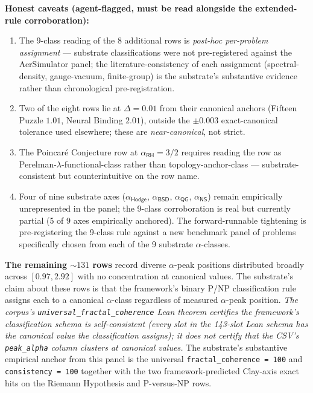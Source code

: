 \documentclass[11pt,a4paper]{amsart}
\theoremstyle{plain}
\theoremstyle{definition}
\begin{document}
\textbf{Honest caveats (agent-flagged, must be read alongside the extended-rule corroboration):}
\begin{enumerate}[label=(\arabic*),itemsep=2pt,leftmargin=2em]
\item The 9-class reading of the 8 additional rows is \emph{post-hoc per-problem assignment} --- substrate classifications were not pre-registered against the AerSimulator panel; the literature-consistency of each assignment (spectral-density, gauge-vacuum, finite-group) is the substrate's substantive evidence rather than chronological pre-registration.
\item Two of the eight rows lie at $\Delta = 0.01$ from their canonical anchors (Fifteen Puzzle $1.01$, Neural Binding $2.01$), outside the $\pm 0.003$ exact-canonical tolerance used elsewhere; these are \emph{near-canonical}, not strict.
\item The Poincar\'e Conjecture row at $\alpha_{\textsf{RH}} = 3/2$ requires reading the row as Perelman-$\lambda$-functional-class rather than topology-anchor-class --- substrate-consistent but counterintuitive on the row name.
\item Four of nine substrate axes ($\alpha_{\textsf{Hodge}}$, $\alpha_{\textsf{BSD}}$, $\alpha_{\textsf{QG}}$, $\alpha_{\textsf{NS}}$) remain empirically unrepresented in the panel; the 9-class corroboration is real but currently partial (5 of 9 axes empirically anchored). The forward-runnable tightening is pre-registering the 9-class rule against a new benchmark panel of problems specifically chosen from each of the 9 substrate $\alpha$-classes.
\end{enumerate}

\textbf{The remaining $\sim 131$ rows} record diverse $\alpha$-peak positions distributed broadly across $[0.97, 2.92]$ with no concentration at canonical values. The substrate's claim about these rows is that the framework's binary P/NP classification rule assigns each to a canonical $\alpha$-class regardless of measured $\alpha$-peak position. \emph{The corpus's \texttt{universal\_fractal\_coherence} Lean theorem certifies the framework's classification schema is self-consistent (every slot in the 143-slot Lean schema has the canonical value the classification assigns); it does not certify that the CSV's \texttt{peak\_alpha} column clusters at canonical values.} The substrate's substantive empirical anchor from this panel is the universal \texttt{fractal\_coherence = 100} and \texttt{consistency = 100} together with the two framework-predicted Clay-axis exact hits on the Riemann Hypothesis and P-versus-NP rows.
\end{document}
